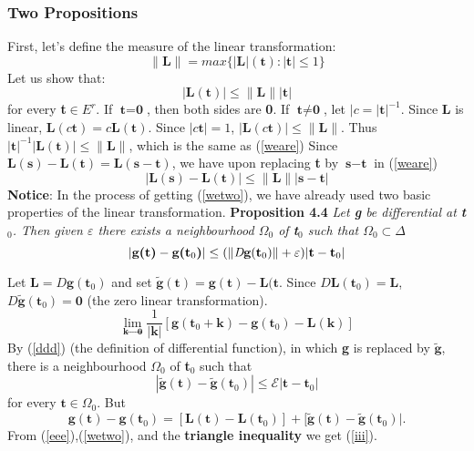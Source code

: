 \documentclass[titlepage,a4paper,12pt]{article}
\theoremstyle{nonumberplain}
\newtheorem{Proof}{\hskip 2em Proof}
\begin{document}
\subsubsection{Two Propositions}
First, let's define the measure of the linear transformation:
$$\lVert\textbf{L}\rVert=max\{|\textbf{L}|(\textbf{t}):|\textbf{t}|\leq 1\}$$
Let us show that:
\begin{equation}
|\textbf{L}(\textbf{t})|\leq \lVert\textbf{L}\rVert|\textbf{t}|
\label{weare}
\end{equation}
for every \textbf{t}$\in E^r$. If $\textbf{t}=\textbf{0}$, then both sides are \textbf{0}. If $\textbf{t}\neq \textbf{0}$, let $|c=|\textbf{t}|^{-1}$. Since \textbf{L} is linear, $\textbf{L}(c\textbf{t})=c\textbf{L}(\textbf{t})$. Since $|c\textbf{t}|=1$, $|\textbf{L}(c\textbf{t})|\leq \lVert\textbf{L}\rVert$. Thus $|\textbf{t}|^{-1}|\textbf{L}(\textbf{t})|\leq \lVert\textbf{L}\rVert$, which is the same as (\ref{weare})
Since $\textbf{L}(\textbf{s})-\textbf{L}(\textbf{t})=\textbf{L}(\textbf{s}-\textbf{t})$, we have upon replacing \textbf{t} by $\textbf{s}-\textbf{t}$ in (\ref{weare})
\begin{equation}
|\textbf{L}(\textbf{s})-\textbf{L}(\textbf{t})|\leq \lVert\textbf{L}\rVert|\textbf{s}-\textbf{t}|
\label{wetwo}
\end{equation}
\textbf{Notice}: In the process of getting (\ref{wetwo}), we have already used two basic properties of the linear transformation.
 \textbf{Proposition 4.4} \emph{Let \emph{\textbf{g}} be differential at \emph{\textbf{t$_0$}}. Then given \emph{$\varepsilon$} there exists a neighbourhood \emph{\textbf{$\Omega_0$}} of \emph{\textbf{t$_0$}} such that \emph{\textbf{$\Omega$$_0$}}$\subset$$\Delta$}
\begin{equation}
 |\textbf{g(t)} - \textbf{g(t$_0$)}|\leq(\|\emph{D}\textbf{g}(\textbf{t$_0$})\| + \varepsilon)|\textbf{t} - \textbf{t$_0$}|
\label{iii}
\end{equation}
\begin{Proof}
Let $\textbf{L}=D\textbf{g}(\textbf{t}_0)$ and set $\tilde{\textbf{g}}(\textbf{t})=\textbf{g}(\textbf{t})-\textbf{L}(\textbf{t}$. Since $D\textbf{L}(\textbf{t}_0)=\textbf{L}$, $D\tilde{\textbf{g}}(\textbf{t}_0)=\textbf{0}$ (the zero linear transformation). 
\begin{equation}
\lim_{\textbf{k}\to\textbf{0}}\frac{1}{|\textbf{k}|}[\textbf{g}(\textbf{t}_0+\textbf{k})-\textbf{g}(\textbf{t}_0)-\textbf{L}(\textbf{k})]
\label{ddd}
\end{equation}
By (\ref{ddd}) (the definition of differential function), in which \textbf{g} is replaced by $\tilde{\textbf{g}}$, there is a neighbourhood $\Omega_0$ of \textbf{t}$_0$ such that 
\begin{equation}
|\tilde{\textbf{g}}(\textbf{t})-\tilde{\textbf{g}}(\textbf{t}_0)|\leq \mathcal{E}|\textbf{t}-\textbf{t}_0|
\tag{*}
\label{eee}
\end{equation}
for every $\textbf{t}\in \Omega_0$. But
$$\textbf{g}(\textbf{t})-\textbf{g}(\textbf{t}_0)=[\textbf{L}(\textbf{t})-\textbf{L}(\textbf{t}_0)]+[\tilde{\textbf{g}}(\textbf{t})-\tilde{\textbf{g}}(\textbf{t}_0)|.$$
From (\ref{eee}),(\ref{wetwo}), and the \textbf{triangle inequality} we get (\ref{iii}).
\end{Proof}
\end{document}
